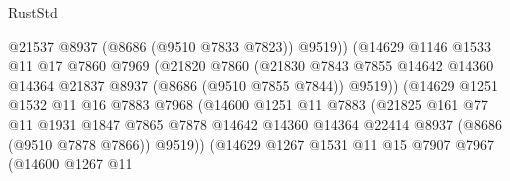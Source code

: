 \begin{lexlean}{RustStd}
\begin{coremodule}
                                    @21537
                                    @8937
                                    (@8686 (@9510 @7833 @7823))
                                    @9519))
                                (@14629
                                  @1146
                                  @1533
                                  @11
                                  @17
                                  @7860
                                  @7969
                                  (@21820
                                    @7860
                                    (@21830
                                      @7843
                                      @7855
                                      @14642
                                      @14360
                                      @14364
                                      @21837
                                      @8937
                                      (@8686 (@9510 @7855 @7844))
                                      @9519))
                                  (@14629
                                    @1251
                                    @1532
                                    @11
                                    @16
                                    @7883
                                    @7968
                                    (@14600
                                      @1251
                                      @11
                                      @7883
                                      (@21825
                                        @161
                                        @77
                                        @11
                                        @1931
                                        @1847
                                        @7865
                                        @7878
                                        @14642
                                        @14360
                                        @14364
                                        @22414
                                        @8937
                                        (@8686 (@9510 @7878 @7866))
                                        @9519))
                                    (@14629
                                      @1267
                                      @1531
                                      @11
                                      @15
                                      @7907
                                      @7967
                                      (@14600
                                        @1267
                                        @11

\end{coremodule}
\end{lexlean}
